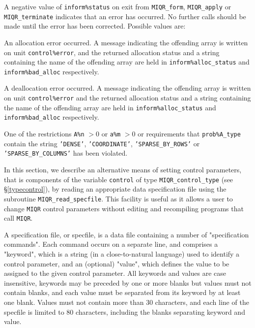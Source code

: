 \documentclass{galahad}
\newcommand{\packagename}{MIQR}
\begin{document}

\galerrors
A negative value of {\tt inform\%status} on exit from 
{\tt \packagename\_form}, 
{\tt \packagename\_apply}
or 
{\tt \packagename\_terminate}
indicates that an error has occurred. No further calls should be made
until the error has been corrected. Possible values are:

\begin{description}

 An allocation error occurred. 
A message indicating the offending 
array is written on unit {\tt control\%error}, and the returned allocation 
status and a string containing the name of the offending array
are held in {\tt inform\%alloc\_\-status}
and {\tt inform\%bad\_alloc} respectively.

 A deallocation error occurred. 
A message indicating the offending 
array is written on unit {\tt control\%error} and the returned allocation 
status and a string containing the name of the offending array
are held in {\tt inform\%alloc\_\-status}
and {\tt inform\%bad\_alloc} respectively.

 One of the restrictions 
   {\tt A\%n} $> 0$ or {\tt a\%m} $> 0$
    or requirements that {\tt prob\%A\_type}
    contain the string
    {\tt 'DENSE'}, {\tt 'COORDINATE'}, {\tt 'SPARSE\_BY\_ROWS'}
    or {\tt 'SPARSE\_BY\_COLUMNS'}
    has been violated.

\end{description}


\galfeatures
\noindent In this section, we describe an alternative means of setting 
control parameters, that is components of the variable {\tt control} of type
{\tt \packagename\_control\_type}
(see \S\ref{typecontrol}), 
by reading an appropriate data specification file using the
subroutine {\tt \packagename\_read\_specfile}. This facility
is useful as it allows a user to change  {\tt \packagename} control parameters 
without editing and recompiling programs that call {\tt \packagename}.

A specification file, or specfile, is a data file containing a number of 
"specification commands". Each command occurs on a separate line, 
and comprises a "keyword", 
which is a string (in a close-to-natural language) used to identify a 
control parameter, and 
an (optional) "value", which defines the value to be assigned to the given
control parameter. All keywords and values are case insensitive, 
keywords may be preceded by one or more blanks but
values must not contain blanks, and
each value must be separated from its keyword by at least one blank.
Values must not contain more than 30 characters, and 
each line of the specfile is limited to 80 characters,
including the blanks separating keyword and value.
\end{document}

